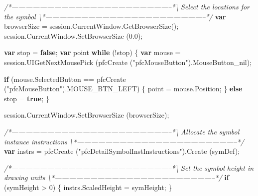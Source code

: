 \documentclass[]{article}
\newenvironment{Shaded}{}{}
\newcommand{\KeywordTok}[1]{\textcolor[rgb]{0.00,0.44,0.13}{\textbf{{#1}}}}
\newcommand{\DecValTok}[1]{\textcolor[rgb]{0.25,0.63,0.44}{{#1}}}
\newcommand{\FloatTok}[1]{\textcolor[rgb]{0.25,0.63,0.44}{{#1}}}
\newcommand{\StringTok}[1]{\textcolor[rgb]{0.25,0.44,0.63}{{#1}}}
\newcommand{\CommentTok}[1]{\textcolor[rgb]{0.38,0.63,0.69}{\textit{{#1}}}}
\newcommand{\OtherTok}[1]{\textcolor[rgb]{0.00,0.44,0.13}{{#1}}}
\newcommand{\FunctionTok}[1]{\textcolor[rgb]{0.02,0.16,0.49}{{#1}}}
\newcommand{\NormalTok}[1]{{#1}}
\begin{document}
\begin{Shaded}
\begin{Highlighting}[]
\CommentTok{/*--------------------------------------------------------------------*\textbackslash{} }
\CommentTok{  Select the locations for the symbol}
\CommentTok{\textbackslash{}*--------------------------------------------------------------------*/}
  \KeywordTok{var} \NormalTok{browserSize = }\OtherTok{session}\NormalTok{.}\OtherTok{CurrentWindow}\NormalTok{.}\FunctionTok{GetBrowserSize}\NormalTok{();}
  \OtherTok{session}\NormalTok{.}\OtherTok{CurrentWindow}\NormalTok{.}\FunctionTok{SetBrowserSize} \NormalTok{(}\FloatTok{0.0}\NormalTok{);}
  
  \KeywordTok{var} \NormalTok{stop = }\KeywordTok{false}\NormalTok{;}
  \KeywordTok{var} \NormalTok{point}
  \KeywordTok{while} \NormalTok{(!stop)}
    \NormalTok{\{}
        \KeywordTok{var} \NormalTok{mouse = }
        \OtherTok{session}\NormalTok{.}\FunctionTok{UIGetNextMousePick} \NormalTok{(}\FunctionTok{pfcCreate} \NormalTok{(}\StringTok{"pfcMouseButton"}\NormalTok{).}\FunctionTok{MouseButton_nil}\NormalTok{);}
          
        \KeywordTok{if} \NormalTok{(}\OtherTok{mouse}\NormalTok{.}\FunctionTok{SelectedButton} \NormalTok{== }\FunctionTok{pfcCreate} \NormalTok{(}\StringTok{"pfcMouseButton"}\NormalTok{).}\FunctionTok{MOUSE_BTN_LEFT}\NormalTok{)}
        \NormalTok{\{}
          \NormalTok{point = }\OtherTok{mouse}\NormalTok{.}\FunctionTok{Position}\NormalTok{;}
        \NormalTok{\}}
        \KeywordTok{else}
            \NormalTok{stop = }\KeywordTok{true}\NormalTok{;}
    \NormalTok{\}}
  
    \OtherTok{session}\NormalTok{.}\OtherTok{CurrentWindow}\NormalTok{.}\FunctionTok{SetBrowserSize} \NormalTok{(browserSize);}
 
\CommentTok{/*--------------------------------------------------------------------*\textbackslash{}  }
\CommentTok{  Allocate the symbol instance instructions }
\CommentTok{\textbackslash{}*--------------------------------------------------------------------*/} 
  \KeywordTok{var} \NormalTok{instrs = }
    \FunctionTok{pfcCreate} \NormalTok{(}\StringTok{"pfcDetailSymbolInstInstructions"}\NormalTok{).}\FunctionTok{Create} \NormalTok{(symDef); }
    
\CommentTok{/*--------------------------------------------------------------------*\textbackslash{}    }
\CommentTok{ Set the symbol height in drawing units }
\CommentTok{\textbackslash{}*--------------------------------------------------------------------*/} 
  \KeywordTok{if} \NormalTok{(symHeight > }\DecValTok{0}\NormalTok{)}
  \NormalTok{\{}
      \OtherTok{instrs}\NormalTok{.}\FunctionTok{ScaledHeight} \NormalTok{= symHeight;}
  \NormalTok{\}    }


\end{Highlighting}
\end{Shaded}
\end{document}
